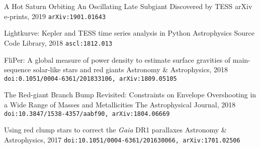 \documentclass[]{k-cv} %
\begin{document}
{{A Hot Saturn Orbiting An Oscillating Late Subgiant Discovered by TESS}}
{arXiv e-prints, 2019}
{\texttt{arXiv:1901.01643}}

{Lightkurve: Kepler and TESS time series analysis in Python}
{Astrophysics Source Code Library, 2018}
{\texttt{ascl:1812.013}}

{FliPer: A global measure of power density to estimate surface gravities of main-sequence solar-like stars and red giants}
{Astronomy \& Astrophysics, 2018}
{\texttt{doi:0.1051/0004-6361/201833106, arXiv:1809.05105}}

{The Red-giant Branch Bump Revisited: Constraints on Envelope Overshooting in a Wide Range of Masses and Metallicities}
{The Astrophysical Journal, 2018}
{\texttt{doi:10.3847/1538-4357/aabf90, arXiv:1804.06669}}

{Using red clump stars to correct the \emph{Gaia} DR1 parallaxes}
{Astronomy \& Astrophysics, 2017}
{\texttt{doi:10.1051/0004-6361/201630066, arXiv:1701.02506}}
\end{document}
